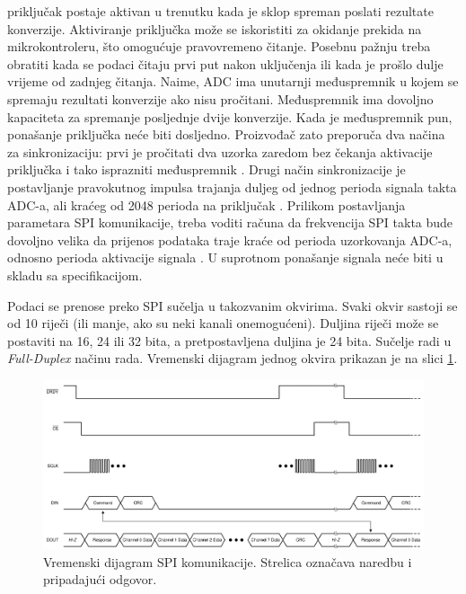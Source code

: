  priključak postaje aktivan u trenutku kada je sklop spreman poslati rezultate konverzije. Aktiviranje priključka može se iskoristiti za okidanje prekida na mikrokontroleru, što omogućuje pravovremeno čitanje. Posebnu pažnju treba obratiti kada se podaci čitaju prvi put nakon uključenja ili kada je prošlo dulje vrijeme od zadnjeg čitanja. Naime, ADC ima unutarnji međuspremnik u kojem se spremaju rezultati konverzije ako nisu pročitani. Međuspremnik ima dovoljno kapaciteta za spremanje posljednje dvije konverzije. Kada je međuspremnik pun, ponašanje priključka  neće biti dosljedno. Proizvođač zato preporuča dva načina za sinkronizaciju: prvi je pročitati dva uzorka zaredom bez čekanja aktivacije  priključka i tako isprazniti međuspremnik \cite{ads131m08_datasheet}. Drugi način sinkronizacije je postavljanje pravokutnog impulsa trajanja duljeg od jednog perioda signala takta ADC-a, ali kraćeg od 2048 perioda na priključak  \cite{ads131m08_datasheet}. Prilikom postavljanja parametara SPI komunikacije, treba voditi računa da frekvencija SPI takta bude dovoljno velika da prijenos podataka traje kraće od perioda uzorkovanja ADC-a, odnosno perioda aktivacije signala . U suprotnom ponašanje signala  neće biti u skladu sa specifikacijom.

Podaci se prenose preko SPI sučelja u takozvanim okvirima. Svaki okvir sastoji se od 10 riječi (ili manje, ako su neki kanali onemogućeni). Duljina riječi može se postaviti na 16, 24 ili 32 bita, a pretpostavljena duljina je 24 bita. Sučelje radi u \textit{Full-Duplex} načinu rada. Vremenski dijagram jednog okvira prikazan je na slici \ref{fig:ads131m08_spi_vremenski_dijagram}.

\begin{figure}[htb]
    \centering
    \includegraphics[width=\textwidth]{slike/ads131m08_spi_vremenski_dijagram.png}
    \caption{Vremenski dijagram SPI komunikacije. Strelica označava naredbu i pripadajući odgovor. \cite{ads131m08_datasheet}}
    \label{fig:ads131m08_spi_vremenski_dijagram}
\end{figure}

